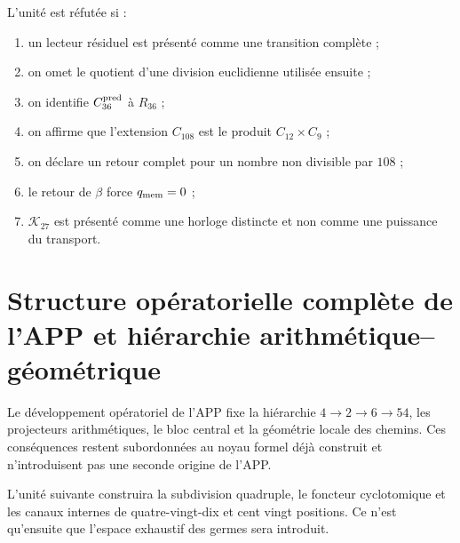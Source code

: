 \begin{criterion}
L’unité est réfutée si :
\begin{enumerate}
 \item un lecteur résiduel est présenté comme une transition complète ;
 \item on omet le quotient d’une division euclidienne utilisée ensuite ;
 \item on identifie \(C_{36}^{\rm pred}\) à \(R_{36}\) ;
 \item on affirme que l’extension \(C_{108}\) est le produit
       \(C_{12}\times C_9\) ;
 \item on déclare un retour complet pour un nombre non divisible par \(108\) ;
 \item le retour de \(\beta\) force \(q_{\rm mem}=0\) ;
 \item \(\mathcal K_{27}\) est présenté comme une horloge distincte et non comme
       une puissance du transport.
\end{enumerate}
\end{criterion}

\section{Structure opératorielle complète de l’APP et hiérarchie arithmétique--géométrique}

Le développement opératoriel de l’APP fixe la hiérarchie
\(4\to2\to6\to54\), les projecteurs arithmétiques, le bloc central et la
géométrie locale des chemins. Ces conséquences restent subordonnées au
noyau formel déjà construit et n’introduisent pas une seconde origine de l’APP.

L’unité suivante construira la subdivision quadruple, le foncteur
cyclotomique et les canaux internes de quatre-vingt-dix et cent vingt positions.
Ce n’est qu’ensuite que l’espace exhaustif des germes sera introduit.

